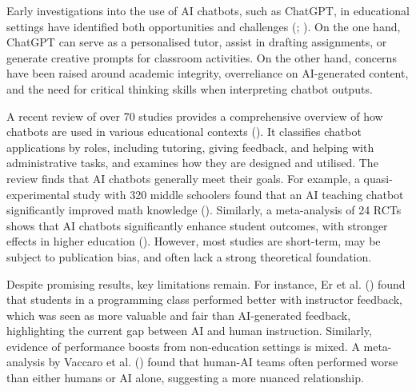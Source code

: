 \documentclass[
  11pt,
]{article}
\begin{document}
Early investigations into the use of AI chatbots, such as ChatGPT, in educational settings have identified both opportunities and challenges (; ). On the one hand, ChatGPT can serve as a personalised tutor, assist in drafting assignments, or generate creative prompts for classroom activities. On the other hand, concerns have been raised around academic integrity, overreliance on AI-generated content, and the need for critical thinking skills when interpreting chatbot outputs.

A recent review of over 70 studies provides a comprehensive overview of how chatbots are used in various educational contexts (). It classifies chatbot applications by roles, including tutoring, giving feedback, and helping with administrative tasks, and examines how they are designed and utilised. The review finds that AI chatbots generally meet their goals. For example, a quasi-experimental study with 320 middle schoolers found that an AI teaching chatbot significantly improved math knowledge (). Similarly, a meta-analysis of 24 RCTs shows that AI chatbots significantly enhance student outcomes, with stronger effects in higher education (). However, most studies are short-term, may be subject to publication bias, and often lack a strong theoretical foundation.

Despite promising results, key limitations remain. For instance, Er et al. () found that students in a programming class performed better with instructor feedback, which was seen as more valuable and fair than AI-generated feedback, highlighting the current gap between AI and human instruction. Similarly, evidence of performance boosts from non-education settings is mixed. A meta-analysis by Vaccaro et al. () found that human-AI teams often performed worse than either humans or AI alone, suggesting a more nuanced relationship.
\end{document}
